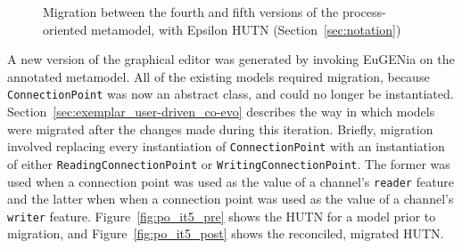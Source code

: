 \begin{figure}[htbp]
	\centering
	\caption{Migration between the fourth and fifth versions of the process-oriented metamodel, with Epsilon HUTN (Section~\ref{sec:notation})}
\end{figure}

A new version of the graphical editor was generated by invoking EuGENia on the annotated metamodel. All of the existing models required migration, because \texttt{Co\-nn\-ec\-ti\-o\-nP\-oi\-nt} was now an abstract class, and could no longer be instantiated. Section~\ref{sec:exemplar_user-driven_co-evo} describes the way in which models were migrated after the changes made during this iteration. Briefly, migration involved replacing every instantiation of \texttt{Co\-nn\-ec\-ti\-o\-nP\-oi\-nt} with an instantiation of either \texttt{Re\-a\-di\-ngCo\-nn\-ec\-ti\-o\-nP\-oi\-nt} or \texttt{Wr\-i\-ti\-ngCo\-nn\-ec\-ti\-o\-nP\-oi\-nt}. The former was used when a connection point was used as the value of a channel's \texttt{re\-ad\-er} feature and the latter when  when a connection point was used as the value of a channel's \texttt{wr\-it\-er} feature. Figure~\ref{fig:po_it5_pre} shows the HUTN for a model prior to migration, and Figure~\ref{fig:po_it5_post} shows the reconciled, migrated HUTN.

